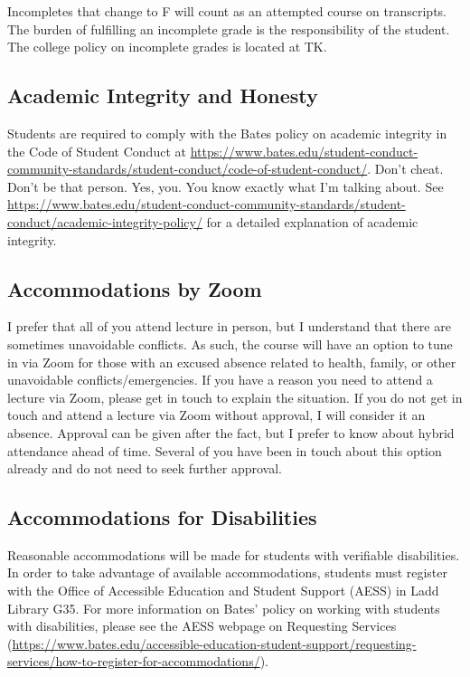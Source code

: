 \documentclass[11pt]{article}
\begin{document}
\footnotesize{Incompletes that change to F will count as an attempted course on transcripts. The burden of fulfilling an incomplete grade is the responsibility of the student. The college policy on incomplete grades is located at TK.}

\subsection*{Academic Integrity and Honesty}
\footnotesize{Students are required to comply with the Bates policy on academic integrity in the Code of Student Conduct at \url{https://www.bates.edu/student-conduct-community-standards/student-conduct/code-of-student-conduct/}. Don't cheat. Don't be that person. Yes, you. You know exactly what I'm talking about. See \url{https://www.bates.edu/student-conduct-community-standards/student-conduct/academic-integrity-policy/} for a detailed explanation of academic integrity.}

\subsection*{Accommodations by Zoom}
\footnotesize{I prefer that all of you attend lecture in person, but I understand that there are sometimes unavoidable conflicts. As such, the course will have an option to tune in via Zoom for those with an excused absence related to health, family, or other unavoidable conflicts/emergencies. If you have a reason you need to attend a lecture via Zoom, please get in touch to explain the situation. If you do not get in touch and attend a lecture via Zoom without approval, I will consider it an absence. Approval can be given after the fact, but I prefer to know about hybrid attendance ahead of time. Several of you have been in touch about this option already and do not need to seek further approval.}

\subsection*{Accommodations for Disabilities}
\footnotesize{Reasonable accommodations will be made for students with verifiable disabilities. In order to take advantage of available accommodations, students must register with the Office of Accessible Education and Student Support (AESS) in Ladd Library G35. For more information on Bates' policy on working with students with disabilities, please see the AESS webpage on Requesting Services (\url{https://www.bates.edu/accessible-education-student-support/requesting-services/how-to-register-for-accommodations/}).}
\end{document}
